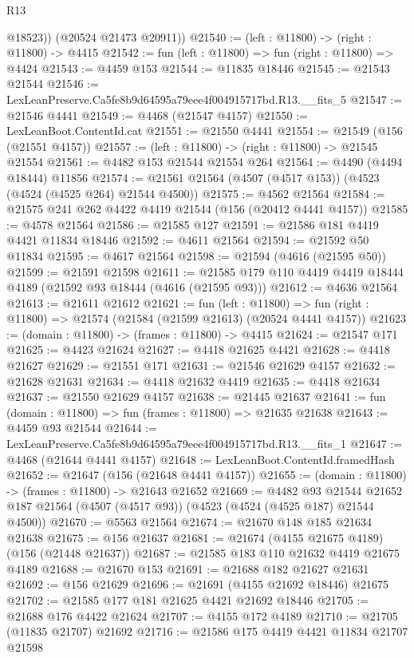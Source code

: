 \begin{lexlean}{R13}
\begin{coremodule}
          @18523))
      (@20524 @21473 @20911))
@21540 := (left : @11800) -> (right : @11800) -> @4415
@21542 := fun (left : @11800) => fun (right : @11800) => @4424
@21543 := @4459 @153
@21544 := @11835 @18446
@21545 := @21543 @21544
@21546 := LexLeanPreserve.Ca5fe8b9d64595a79eee4f004915717bd.R13.__fits_5
@21547 := @21546 @4441
@21549 := @4468 (@21547 @4157)
@21550 := LexLeanBoot.ContentId.cat
@21551 := @21550 @4441
@21554 := @21549 (@156 (@21551 @4157))
@21557 := (left : @11800) -> (right : @11800) -> @21545 @21554
@21561 := @4482 @153 @21544 @21554 @264
@21564 := @4490 (@4494 @18444) @11856
@21574 := @21561 @21564 (@4507 (@4517 @153)) (@4523 (@4524 (@4525 @264) @21544 @4500))
@21575 := @4562 @21564
@21584 := @21575 @241 @262 @4422 @4419 @21544 (@156 (@20412 @4441 @4157))
@21585 := @4578 @21564
@21586 := @21585 @127
@21591 := @21586 @181 @4419 @4421 @11834 @18446
@21592 := @4611 @21564
@21594 := @21592 @50 @11834
@21595 := @4617 @21564
@21598 := @21594 (@4616 (@21595 @50))
@21599 := @21591 @21598
@21611 := @21585 @179 @110 @4419 @4419 @18444 @4189 (@21592 @93 @18444 (@4616 (@21595 @93)))
@21612 := @4636 @21564
@21613 := @21611 @21612
@21621 := fun (left : @11800) =>
  fun (right : @11800) => @21574 (@21584 (@21599 @21613) (@20524 @4441 @4157))
@21623 := (domain : @11800) -> (frames : @11800) -> @4415
@21624 := @21547 @171
@21625 := @4423 @21624
@21627 := @4418 @21625 @4421
@21628 := @4418 @21627
@21629 := @21551 @171
@21631 := @21546 @21629 @4157
@21632 := @21628 @21631
@21634 := @4418 @21632 @4419
@21635 := @4418 @21634
@21637 := @21550 @21629 @4157
@21638 := @21445 @21637
@21641 := fun (domain : @11800) => fun (frames : @11800) => @21635 @21638
@21643 := @4459 @93 @21544
@21644 := LexLeanPreserve.Ca5fe8b9d64595a79eee4f004915717bd.R13.__fits_1
@21647 := @4468 (@21644 @4441 @4157)
@21648 := LexLeanBoot.ContentId.framedHash
@21652 := @21647 (@156 (@21648 @4441 @4157))
@21655 := (domain : @11800) -> (frames : @11800) -> @21643 @21652
@21669 := @4482
    @93
    @21544
    @21652
    @187
    @21564
    (@4507 (@4517 @93))
    (@4523 (@4524 (@4525 @187) @21544 @4500))
@21670 := @5563 @21564
@21674 := @21670 @148 @185 @21634 @21638
@21675 := @156 @21637
@21681 := @21674 (@4155 @21675 @4189) (@156 (@21448 @21637))
@21687 := @21585 @183 @110 @21632 @4419 @21675 @4189
@21688 := @21670 @153
@21691 := @21688 @182 @21627 @21631
@21692 := @156 @21629
@21696 := @21691 (@4155 @21692 @18446) @21675
@21702 := @21585 @177 @181 @21625 @4421 @21692 @18446
@21705 := @21688 @176 @4422 @21624
@21707 := @4155 @172 @4189
@21710 := @21705 (@11835 @21707) @21692
@21716 := @21586 @175 @4419 @4421 @11834 @21707 @21598

\end{coremodule}
\end{lexlean}
